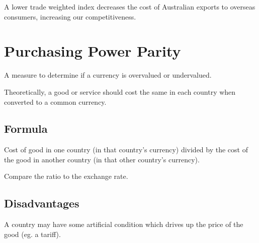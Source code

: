 \documentclass[a4paper,11pt]{article}
\begin{document}
A lower trade weighted index decreases the cost of Australian exports to
overseas consumers, increasing our competitiveness.




\section{Purchasing Power Parity}

A measure to determine if a currency is overvalued or undervalued.

Theoretically, a good or service should cost the same in each country when
converted to a common currency.


\subsection{Formula}

Cost of good in one country (in that country's currency) divided by the cost of
the good in another country (in that other country's currency).

Compare the ratio to the exchange rate.


\subsection{Disadvantages}

A country may have some artificial condition which drives up the price of the
good (eg. a tariff).
\end{document}
